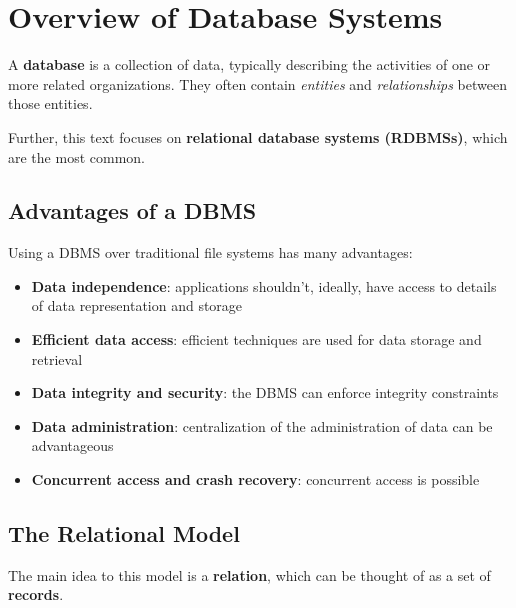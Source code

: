 \chapter{Overview of Database Systems}

A \textbf{database} is a collection of data, typically describing the activities of one or more related organizations. They often contain \emph{entities} and \emph{relationships} between those entities. \par

Further, this text focuses on \textbf{relational database systems (RDBMSs)}, which are the most common.

\section{Advantages of a DBMS}
Using a DBMS over traditional file systems has many advantages:
\begin{itemize}
	\item \textbf{Data independence}: applications shouldn't, ideally, have access to details of data representation and storage
	\item \textbf{Efficient data access}: efficient techniques are used for data storage and retrieval
	\item \textbf{Data integrity and security}: the DBMS can enforce integrity constraints
	\item \textbf{Data administration}: centralization of the administration of data can be advantageous
	\item \textbf{Concurrent access and crash recovery}: concurrent access is possible
\end{itemize}

\section{The Relational Model}
The main idea to this model is a \textbf{relation}, which can be thought of as a set of \textbf{records}.
